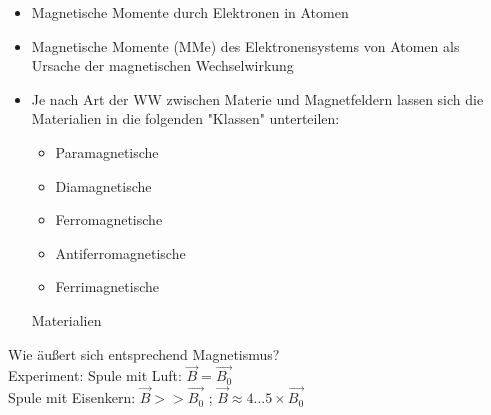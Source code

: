 \begin{itemize}
	\item Magnetische Momente durch Elektronen in Atomen
	\item Magnetische Momente (MMe) des Elektronensystems von Atomen als Ursache der magnetischen Wechselwirkung
	\item Je nach Art der WW zwischen Materie und Magnetfeldern lassen sich die Materialien in die folgenden "Klassen" unterteilen:
	\begin{itemize}
		\item Paramagnetische
		\item Diamagnetische
		\item Ferromagnetische
		\item Antiferromagnetische
		\item Ferrimagnetische
	\end{itemize}
	Materialien
\end{itemize}
Wie äußert sich entsprechend Magnetismus?\\
Experiment: Spule mit Luft: $ \vec{B} = \vec{B_0} $\\
\indent Spule mit Eisenkern: $ \vec{B} >> \vec{B_0} $ ; $ \vec{B} \approx 4...5 \times \vec{B_0} $

